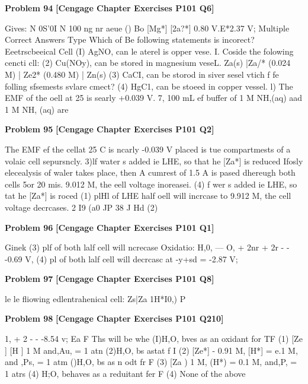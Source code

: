 \begin{problembox}
\textbf{Problem 94} \hfill \textbf{[Cengage Chapter Exercises P101 Q6]}
\label{q:ext-cng-th-94}

Gives:
N 0S'0I N 100 ng nr aeue ()
Bo
[Mg*]
[2a?*]
0.80 V.E*2.37 V;
Multiple Correct Answers Type
Which of Be following statements is  incorect?
Eeetrscbeeical Cell
(I) AgNO, can le aterel is opper vese.
I. Coside the folowing cencti cll:
(2) Cu(NOy), can be stored in magnesium veseL.
Za(s) |Za/* (0.024 M) | Ze2* (0.480 M) | Zn(s)
(3) CaCI, can be storod in siver sesel
vtich f fe folling sfsemests svlare cmect?
(4) HgC1, can be stoeed in copper vessel.
l) The EMF of the oell at 25  is searly +0.039 V.
7, 100 mL ef buffer of 1 M NH,(aq) aad 1 M NH, (aq) are
\end{problembox}

\begin{problembox}
\textbf{Problem 95} \hfill \textbf{[Cengage Chapter Exercises P101 Q2]}
\label{q:ext-cng-th-95}

The EMF ef the cellat 25  C is ncarly -0.039 V
placed is tue compartmests of a volaic cell sepursncly.
3)lf water s added ie LHE, so that he [Za*] is reduced
Ifosly elecealysis of waler takes place, then
A cumrest of 1.5 A is pased dhereugh both cells 5or 20 mis.
9.012 M, the eell voltage inoreasei.
(4) f wer s added ie LHE, so tat he [Za*] is roced
(1) plHl of LHE half oell will incrcase
to 9.912 M, the cell voltage decrcases.
2 I9 (a0 JP 38 J Hd (2)
\end{problembox}

\begin{problembox}
\textbf{Problem 96} \hfill \textbf{[Cengage Chapter Exercises P101 Q1]}
\label{q:ext-cng-th-96}

Ginek
(3) plf of both lalf cell will ncrecase
Oxidatio: H,0, ---  O, + 2nr + 2r
- - -0.69 V,
(4) pl of both lalf cell will decrcasc
at -y+sd
= -2.87 V;
\end{problembox}

\begin{problembox}
\textbf{Problem 97} \hfill \textbf{[Cengage Chapter Exercises P101 Q8]}
\label{q:ext-cng-th-97}

le le fliowing edlentrahenical cell:
Zs|Za 1H*I0,) P
\end{problembox}

\begin{problembox}
\textbf{Problem 98} \hfill \textbf{[Cengage Chapter Exercises P101 Q210]}
\label{q:ext-cng-th-98}

1, + 2
- - -8.54 v;
Ea  F Ths will be whe
(I)H,O, bves as an oxidant for TF
(1) [Ze ]  [H ]  1 M and,Au, = 1 atn
(2)H,O, bs astat f I
(2) [Ze*] - 0.91 M, [H*] = e.1 M, and ,Ps, = 1 atm
()H,O, bs as n odt fr F
(3) [Za )  1 M, (H*) = 0.1 M, and,P, = 1 atrs
(4) H;O, behaves as a reduitant fer F
(4) None of the above
\end{problembox}

